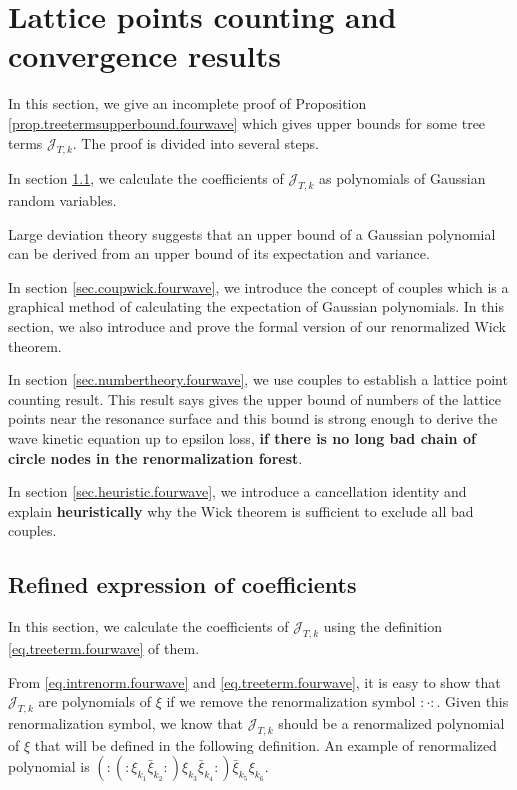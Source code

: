 \section{Lattice points counting and convergence results}
In this section, we give an incomplete proof of Proposition \ref{prop.treetermsupperbound.fourwave} which gives upper bounds for some tree terms $\mathcal{J}_{T,k}$. The proof is divided into several steps.

In section \ref{sec.refexp.fourwave}, we calculate the coefficients of $\mathcal{J}_{T,k}$ as polynomials of Gaussian random variables.

Large deviation theory suggests that an upper bound of a Gaussian polynomial can be derived from an upper bound of its expectation and variance.

In section \ref{sec.coupwick.fourwave}, we introduce the concept of couples which is a graphical method of calculating the expectation of Gaussian polynomials. In this section, we also introduce and prove the formal version of our renormalized Wick theorem.

In section \ref{sec.numbertheory.fourwave}, we use couples to establish a lattice point counting result. This result says gives the upper bound of numbers of the lattice points near the resonance surface and this bound is strong enough to derive the wave kinetic equation up to epsilon loss, \textbf{if there is no long bad chain of circle nodes in the renormalization forest}.

In section \ref{sec.heuristic.fourwave}, we introduce a cancellation identity and explain \textbf{heuristically} why the Wick theorem is sufficient to exclude all bad couples.






\subsection{Refined expression of coefficients}\label{sec.refexp.fourwave} In this section, we calculate the coefficients of $\mathcal{J}_{T,k}$ using the definition \eqref{eq.treeterm.fourwave} of them.



From \eqref{eq.intrenorm.fourwave} and \eqref{eq.treeterm.fourwave}, it is easy to show that $\mathcal{J}_{T,k}$ are polynomials of $\xi$ if we remove the renormalization symbol $:\cdot:$. Given this renormalization symbol, we know that $\mathcal{J}_{T,k}$ should be a renormalized polynomial of $\xi$ that will be defined in the following definition. An example of renormalized polynomial is $(:(:\xi_{k_1}\bar{\xi}_{k_2}:)\xi_{k_3}\bar{\xi}_{k_4}:)\bar{\xi}_{k_5}\xi_{k_6}$.

